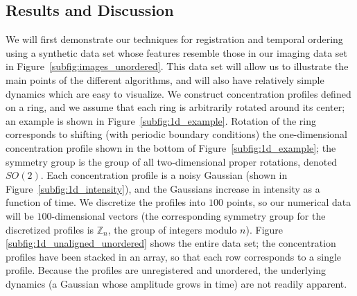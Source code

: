 \documentclass{pnastwo}
\begin{document}
\begin{article}
\section{Results and Discussion}

%
%
%
%


We will first demonstrate our techniques for registration and temporal ordering using a synthetic data set whose features resemble those in our imaging data set in Figure~\ref{subfig:images_unordered}.
%
This data set will allow us to illustrate the main points of the different algorithms, and will also have relatively simple dynamics which are easy to visualize.
%
We construct concentration profiles defined on a ring, and we assume that each ring is arbitrarily rotated around its center; an example is shown in Figure~\ref{subfig:1d_example}.
%
Rotation of the ring corresponds to shifting (with periodic boundary conditions) the one-dimensional concentration profile shown in the bottom of Figure~\ref{subfig:1d_example}; the symmetry group is the group of all two-dimensional proper rotations, denoted $SO(2)$.
%
Each concentration profile is a noisy Gaussian (shown in Figure~\ref{subfig:1d_intensity}), and the Gaussians increase in intensity as  a function of time.
%
We discretize the profiles into $100$ points, so our numerical data will be $100$-dimensional vectors (the corresponding symmetry group for the discretized profiles is $\mathbb{Z}_n$, the group of integers modulo $n$).
%
Figure \ref{subfig:1d_unaligned_unordered} shows the entire data set; the concentration profiles have been stacked in an array, so that each row corresponds to a single profile.
%
Because the profiles are unregistered and unordered, the underlying dynamics (a Gaussian whose amplitude grows in time) are not readily apparent.


\end{article}
\end{document}
